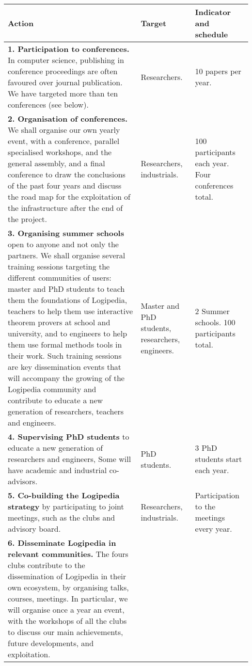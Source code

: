 \begin{longtable*}{|p{0.55\textwidth}|p{0.12\textwidth}|p{0.15\textwidth}|}
\hline
{\bf Action}
&
{\bf Target}
&
{\bf Indicator and schedule}
\\
\hline
{\bf 1. Participation to conferences.}
In computer science, publishing in conference
proceedings are often favoured over journal publication. We have targeted
more than ten conferences (see below).
&
Researchers.
&
10 papers per year.
\\
\hline
{\bf 2. Organisation of conferences.}
We shall organise our own yearly event, with a conference, parallel
specialised workshops, and the general assembly, and a final
conference to draw the conclusions of the past four years and discuss the
road map for the exploitation of the infrastructure after the end of the
project.
&
Researchers, industrials.
&
100 participants each year. Four conferences total.
\\
\hline
{\bf 3. Organising summer schools}
open to anyone and not only the partners.
We shall organise several training sessions targeting the
different communities of users: master and PhD students to teach them
the foundations of Logipedia, teachers to help them use interactive
theorem provers at school and university, and to engineers to help
them use formal methods tools in their work. Such training sessions
are key dissemination events that will accompany the growing of the
Logipedia community and contribute to educate a new generation of researchers,
teachers and engineers.
&
Master and PhD students, researchers, engineers.
&
2 Summer schools. 100 participants total.
\\
\hline
    {\bf 4.
Supervising PhD students} 
to educate a new generation of researchers and engineers, 
Some will have academic and industrial co-advisors.
&
PhD students.
&
3 PhD students start each year.
\\
\hline
{\bf 5. Co-building the Logipedia strategy}
by participating to joint meetings, such as
the clubs and advisory board.
&
Researchers, industrials.
&
Participation to the meetings
every year.
\\
\hline
{\bf 6. Disseminate Logipedia in relevant communities.}
The fours clubs contribute to the dissemination of
Logipedia in their own ecosystem, by organising talks,
courses, meetings.
In particular, we will organise once a year an event, 
with the workshops of all the clubs to discuss our main achievements,
future developments, and exploitation.

\end{longtable*}
